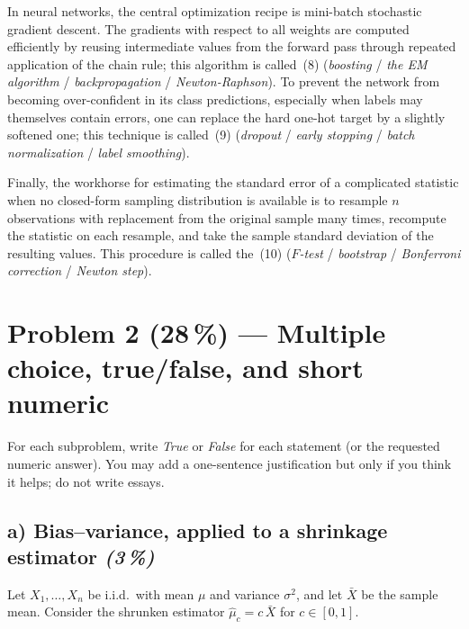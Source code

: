 \documentclass[11pt,a4paper]{article}
\newcommand{\points}[1]{\textbf{(#1\,\%)}}
\newcommand{\subpoints}[1]{\textit{(#1\,\%)}}
\begin{document}
In neural networks, the central optimization recipe is mini-batch stochastic gradient descent. The gradients with respect to all weights are computed efficiently by reusing intermediate values from the forward pass through repeated application of the chain rule; this algorithm is called \underline{\hspace{2.5cm}}\,(8) (\emph{boosting} / \emph{the EM algorithm} / \emph{backpropagation} / \emph{Newton-Raphson}). To prevent the network from becoming over-confident in its class predictions, especially when labels may themselves contain errors, one can replace the hard one-hot target by a slightly softened one; this technique is called \underline{\hspace{2.5cm}}\,(9) (\emph{dropout} / \emph{early stopping} / \emph{batch normalization} / \emph{label smoothing}).

Finally, the workhorse for estimating the standard error of a complicated statistic when no closed-form sampling distribution is available is to resample $n$ observations with replacement from the original sample many times, recompute the statistic on each resample, and take the sample standard deviation of the resulting values. This procedure is called the \underline{\hspace{2.5cm}}\,(10) (\emph{$F$-test} / \emph{bootstrap} / \emph{Bonferroni correction} / \emph{Newton step}).

\vfill\eject

\section*{Problem 2 \points{28} --- Multiple choice, true/false, and short numeric}

For each subproblem, write \emph{True} or \emph{False} for each statement (or the requested numeric answer). You may add a one-sentence justification but only if you think it helps; do not write essays.

\subsection*{a) Bias--variance, applied to a shrinkage estimator \subpoints{3}}

Let $X_1, \dots, X_n$ be i.i.d.\ with mean $\mu$ and variance $\sigma^2$, and let $\bar X$ be the sample mean. Consider the shrunken estimator $\hat\mu_c = c \, \bar X$ for $c \in [0, 1]$.
\end{document}
